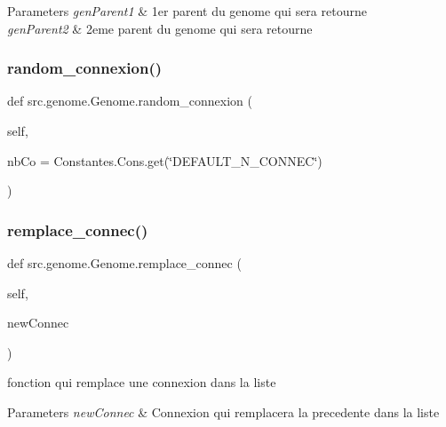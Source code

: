 \begin{DoxyParams}{Parameters}
{\em gen\+Parent1} & 1er parent du genome qui sera retourne \\
\hline
{\em gen\+Parent2} & 2eme parent du genome qui sera retourne \\
\hline
\end{DoxyParams}
\mbox{\label{classsrc_1_1genome_1_1_genome_a5c4aafd46df32ddc9b44fbb07829570e}} 
\subsubsection{\texorpdfstring{random\+\_\+connexion()}{random\_connexion()}}
{\footnotesize\ttfamily def src.\+genome.\+Genome.\+random\+\_\+connexion (\begin{DoxyParamCaption}\item[{}]{self,  }\item[{}]{nb\+Co = {\ttfamily Constantes.Cons.get(\char`\"{}DEFAULT\+\_\+N\+\_\+CONNEC\char`\"{})} }\end{DoxyParamCaption})}

\mbox{\label{classsrc_1_1genome_1_1_genome_a8bd17817c6103d0b9b6ab8ed95352b16}} 
\subsubsection{\texorpdfstring{remplace\+\_\+connec()}{remplace\_connec()}}
{\footnotesize\ttfamily def src.\+genome.\+Genome.\+remplace\+\_\+connec (\begin{DoxyParamCaption}\item[{}]{self,  }\item[{}]{new\+Connec }\end{DoxyParamCaption})}



fonction qui remplace une connexion dans la liste 


\begin{DoxyParams}{Parameters}
{\em new\+Connec} & Connexion qui remplacera la precedente dans la liste \\
\hline
\end{DoxyParams}
\mbox{\label{classsrc_1_1genome_1_1_genome_aa6a19674e0dd3cf702f66e9ef20914ee}} 
